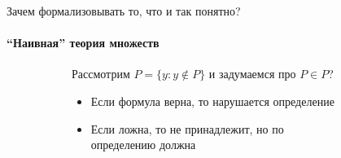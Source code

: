 \begin{frame}{Зачем формализовывать то, что и так понятно?}
\framesubtitle{\enquote{Наивная} теория множеств}
 	\begin{figure}[t]
 		\begin{subfigure}[t]{0.60\textwidth}
 			\vspace{-7em}
 			Рассмотрим $P=\{y: y\notin P\}$ и задумаемся про $P\in P$?
 			\begin{itemize}
 				\item Если формула верна, то нарушается определение
 				\item Если ложна, то не принадлежит, но по определению должна
 			\end{itemize}


\end{subfigure}
\end{figure}
\end{frame}
